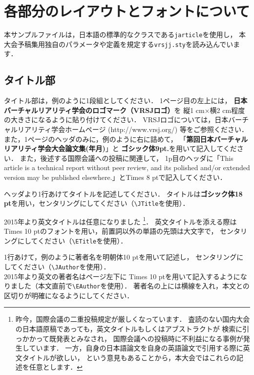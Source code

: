 \documentclass[a4paper]{jarticle}
\newcounter{vrsjyear}
\newcounter{vrsjmonth}
\newcounter{vrsjnum}
\begin{document}
\section{各部分のレイアウトとフォントについて}%

本サンプルファイルは，日本語\LaTeXe の標準的なクラスである\verb+jarticle+を使用し，
本大会予稿集用独自のパラメータや定義を規定する\verb+vrsjj.sty+を読み込んでいます．

\subsection{タイトル部}

タイトル部は，例のように1段組としてください．
1ページ目の左上には，
{\bf 日本バーチャルリアリティ学会のロゴマーク（VRSJロゴ）}を
縦1 cm×横2 cm程度の大きさになるように貼り付けてください．
VRSJロゴについては，日本バーチャルリアリティ学会ホームページ
 (http://www.vrsj.org/) 等をご参照ください．
また，1ページのヘッダのみに，例のように右に詰めて，
「{\bf 第回日本バーチャルリアリティ学会大会論文集(年月)}」と
{\bf ゴシック体9pt.}を用いて記入してください．
また，後述する国際会議への投稿に関連して，
1p目のヘッダに「This article is a technical report without peer review, and its polished and/or extended version may be published elsewhere.」と{\tiny Times 8 pt}で記入してください．

ヘッダより1行あけてタイトルを記述してください．
タイトルは{\bf ゴシック体18 pt}を用い，センタリングにしてください（\verb+\JTitle+を使用）．

2015年より英文タイトルは任意になりました%
\footnote{\baselineskip%
昨今，国際会議の二重投稿規定が厳しくなっています．
査読のない国内大会の日本語原稿であっても，英文タイトルもしくはアブストラクトが
検索に引っかかって既発表とみなされ，
国際会議への投稿時に不利益になる事例が発生しています．
一方，自身の日本語論文を自身の英語論文で引用する際に英文タイトルが欲しい，
という意見もあることから，本大会ではこれらの記述を任意とします．}．
英文タイトルを添える際は{\normalsize Times 10 pt}のフォントを用い，前置詞以外の単語の先頭は大文字で，
センタリングにしてください（\verb+\ETitle+を使用）．

1行あけて，例のように著者名を{\normalsize 明朝体10 pt}を用いて記述し，
センタリングにしてください（\verb+\JAuthor+を使用）．
\\
2015年より英文の著者名はページ左下に
{\normalsize\rm Times 10 pt}を用いて記入するようになりました（本文直前で\verb+\EAuthor+を使用）．
著者名の上には横線を入れ，本文との区切りが明確になるようにしてください．
\end{document}
